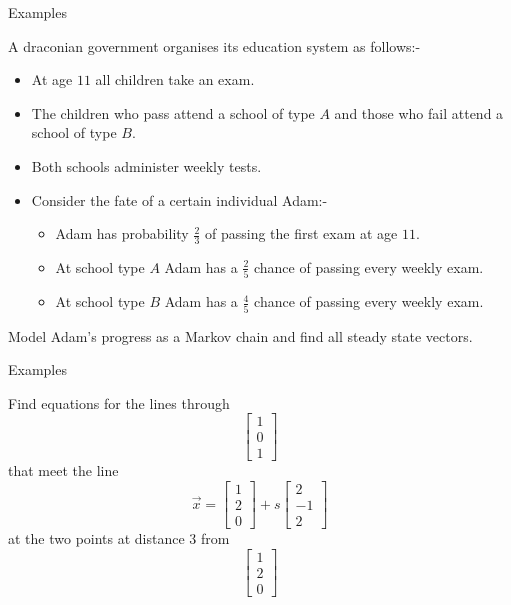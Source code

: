 \documentclass{beamer}
\begin{document}
\begin{frame}{Examples}
\begin{example}
	A draconian government organises its education system as follows:-
	\begin{itemize}
		\item At age $11$ all children take an exam.
		\item The children who pass attend a school of type $A$ and those who fail attend a school of type $B$.
		\item Both schools administer weekly tests.
		\item Consider the fate of a certain individual Adam:-
		\begin{itemize}
			\item Adam has probability $\frac{2}{3}$ of passing the first exam at age $11$.
			\item At school type $A$ Adam has a $\frac{2}{5}$ chance of passing every weekly exam.
			\item At school type $B$ Adam has a $\frac{4}{5}$ chance of passing every weekly exam.
		\end{itemize}
	\end{itemize}
	Model Adam's progress as a Markov chain and find all steady state vectors.
\end{example}
\end{frame}

\begin{frame}{Examples}
\begin{example}
	Find equations for the lines through
	\begin{equation*}
	\left[
	\begin{matrix}
	1\\
	0\\
	1
	\end{matrix}
	\right]
	\end{equation*}
	that meet the line
	\begin{equation*}
	\vec{x} = \left[
	\begin{matrix}
	1\\
	2\\
	0
	\end{matrix}
	\right]+s \left[
	\begin{matrix}
	2\\
	-1\\
	2
	\end{matrix}
	\right]
	\end{equation*}
	at the two points at distance $3$ from 
	\begin{equation*}
	\left[
	\begin{matrix}
	1\\
	2\\
	0
	\end{matrix}
	\right]
	\end{equation*}
\end{example}
\end{frame}
\end{document}
